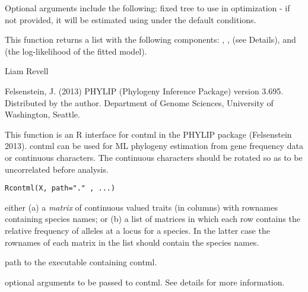 \documentclass[a4paper]{book}
\begin{document}
%
\begin{Details}\relax
Optional arguments include the following:  fixed tree to use in optimization - if not provided, it will be estimated using  under the default conditions.
\end{Details}
%
\begin{Value}
This function returns a list with the following components: , ,  (see Details), and  (the log-likelihood of the fitted model).
\end{Value}
%
\begin{Author}\relax
Liam Revell 
\end{Author}
%
\begin{References}\relax
Felsenstein, J. (2013) PHYLIP (Phylogeny Inference Package) version 3.695. Distributed by the author. Department of Genome Sciences, University of Washington, Seattle.
\end{References}
%
\begin{SeeAlso}\relax
{}
\end{SeeAlso}
%
\begin{Description}\relax
This function is an R interface for contml in the PHYLIP package (Felsenstein 2013). contml can be used for ML phylogeny estimation from gene frequency data or continuous characters. The continuous characters should be rotated so as to be uncorrelated before analysis.
\end{Description}
%
\begin{Usage}
\begin{verbatim}
Rcontml(X, path="." , ...)
\end{verbatim}
\end{Usage}
%
\begin{Arguments}
\begin{ldescription}
\item[\code{X}] either (a) a \emph{matrix} of continuous valued traits (in columns) with rownames containing species names; or (b) a list of matrices in which each row contains the relative frequency of alleles at a locus for a species. In the latter case the rownames of each matrix in the list should contain the species names.
\item[\code{path}] path to the executable containing contml.
\item[\code{...}] optional arguments to be passed to contml. See details for more information.
\end{ldescription}
\end{Arguments}
\end{document}
